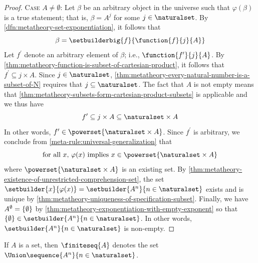 \begin{proof}
    \vspace{0.3cm}
    \noindent
    {\scshape Case} \( A \neq \emptyset \):
    Let \( \beta \) be an arbitrary object in the universe such that \( \varphi(\beta) \) is a true statement;
    that is, \( \beta = A^{j} \) for some \( j \in \naturalset \).
    By \cref{dfn:metatheory-set-exponentiation}, it follows that
    \begin{equation*}
        \beta = \setbuilderbig{f}{\function{f}{j}{A}}
    \end{equation*}
    Let \( f^{\prime} \) denote an arbitrary element of \( \beta \); i.e., \( \function{f^{\prime}}{j}{A} \).
    By \cref{thm:metatheory-function-is-subset-of-cartesian-product}, it follows that \( f^{\prime} \subseteq j \times A \).
    Since \( j \in \naturalset \), \cref{thm:metatheory-every-natural-number-is-a-subset-of-N} requires that \( j \subseteq \naturalset \).
    The fact that \( A \) is not empty means that \cref{thm:metatheory-subsets-form-cartesian-product-subsets} is applicable and we thus have
    \begin{equation*}
        f^{\prime} \subseteq j \times A \subseteq \naturalset \times A
    \end{equation*}
    In other words, \( f^{\prime} \in \powerset{\naturalset \times A} \). Since \( f^{\prime} \) is arbitrary, we conclude from \cref{meta-rule:universal-generalization}
    that
    \begin{equation*}
        \text{for all \( x \), \( \varphi(x) \) implies \( x \in \powerset{\naturalset \times A} \)}
    \end{equation*}
    where \( \powerset{\naturalset \times A} \) is an existing set.
    By \cref{thm:metatheory-existence-of-unrestricted-comprehension-set}, the set \( \setbuilder{x}{\varphi(x)} = \setbuilder{A^{n}}{n \in \naturalset} \) exists
    and is unique by \cref{thm:metatheory-uniqueness-of-specification-subset}.
    Finally, we have \( A^{\emptyset} = \mleft\{ \emptyset \mright\} \) by \cref{thm:metatheory-exponentiation-with-empty-exponent} so that
    \( \mleft\{ \emptyset \mright\} \in \setbuilder{A^{n}}{n \in \naturalset} \).
    In other words, \( \setbuilder{A^{n}}{n \in \naturalset} \) is non-empty.
\end{proof}

\begin{dfn}
     \label{dfn:metatheory-set-of-all-finite-sequence}
    If \( A \) is a set, then \( \finiteseq{A} \) denotes the set \( \Union \sequence{A^{n}}{n \in \naturalset} \).
\end{dfn}

